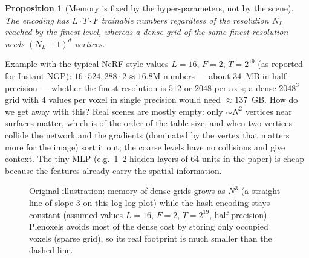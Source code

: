 \documentclass[11pt,a4paper]{article}
\theoremstyle{definition}
\theoremstyle{plain}
\newtheorem{proposition}[definition]{Proposition}
\theoremstyle{remark}
\begin{document}
\begin{proposition}[Memory is fixed by the hyper-parameters, not by the scene]\label{prop:hashmem}
The encoding has $L\cdot T\cdot F$ trainable numbers regardless of the resolution $N_L$ reached by the finest level, whereas a dense grid of the same finest resolution needs $(N_L+1)^d$ vertices.
\end{proposition}
\begin{intuition}
Example with the typical NeRF-style values $L=16$, $F=2$, $T=2^{19}$ (as reported for Instant-NGP): $16\cdot524{,}288\cdot2\approx16.8$M numbers --- about $34$~MB in half precision --- whether the finest resolution is $512$ or $2048$ per axis; a dense $2048^3$ grid with 4 values per voxel in single precision would need $\approx137$~GB. How do we get away with this? Real scenes are mostly empty: only $\sim N^2$ vertices near surfaces matter, which is of the order of the table size, and when two vertices collide the network and the gradients (dominated by the vertex that matters more for the image) sort it out; the coarse levels have no collisions and give context. The tiny MLP (e.g.\ 1--2 hidden layers of 64 units in the paper) is cheap because the features already carry the spatial information.
\end{intuition}

\begin{figure}[H]
\centering
{}
\caption{Original illustration: memory of dense grids grows as $N^3$ (a straight line of slope 3 on this log-log plot) while the hash encoding stays constant (assumed values $L=16$, $F=2$, $T=2^{19}$, half precision). Plenoxels avoids most of the dense cost by storing only occupied voxels (sparse grid), so its real footprint is much smaller than the dashed line.}
\end{figure}
\end{document}
